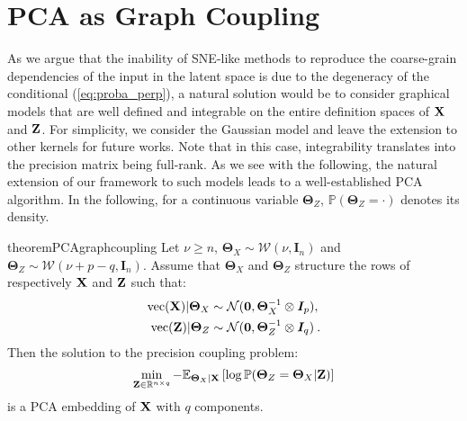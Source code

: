 \section{PCA as Graph Coupling}

As we argue that the inability of SNE-like methods to reproduce the coarse-grain dependencies of the input in the latent space is due to the degeneracy of the conditional (\ref{eq:proba_perp}), a natural solution would be to consider graphical models that are well defined and integrable on the entire definition spaces of $\mathbf{X}$ and $\mathbf{Z}$. For simplicity, we consider the Gaussian model and leave the extension to other kernels for future works. Note that in this case, integrability translates into the precision matrix being full-rank. As we see with the following, the natural extension of our framework to such models leads to a well-established PCA algorithm. In the following, for a continuous variable $\bm{\Theta}_{Z}$, $\mathbb{P}(\bm{\Theta}_{Z} = \cdot)$ denotes its density.


\begin{restatable}{theorem}{PCAgraphcoupling}
\label{PCA_graph_coupling}
Let $\nu \geq n$,  $\bm{\Theta}_{X} \sim \mathcal{W}(\nu, \bm{I}_n)$ and $\bm{\Theta}_{Z} \sim \mathcal{W}(\nu + p - q, \bm{I}_n)$. Assume that $\bm{\Theta}_{X}$ and $\bm{\Theta}_{Z}$ structure the rows of respectively $\mathbf{X}$ and $\mathbf{Z}$ such that: 
\begin{align}
    \mathrm{vec}(\mathbf{X}) | \bm{\Theta}_{X} &\sim \mathcal{N}(\bm{0}, \bm{\Theta}_{X}^{-1} \otimes \bm{I}_p), \label{eq:X_given_theta} \\
    \mathrm{vec}(\mathbf{Z}) | \bm{\Theta}_{Z} &\sim \mathcal{N}(\bm{0}, \bm{\Theta}_{Z}^{-1} \otimes \bm{I}_q) \label{eq:Z_given_theta} \:.
\end{align}
Then the solution to the precision coupling problem:
\begin{align*}
    \min_{\mathbf{Z} \in \mathbb{R}^{n \times q}} -\mathbb{E}_{\bm{\Theta}_{X} | \mathbf{X}}\left[\log \mathbb{P}(\bm{\Theta}_{Z}=\bm{\Theta}_{X}|\mathbf{Z})\right]
\end{align*}
is a PCA embedding of $\mathbf{X}$ with $q$ components.
\end{restatable}

